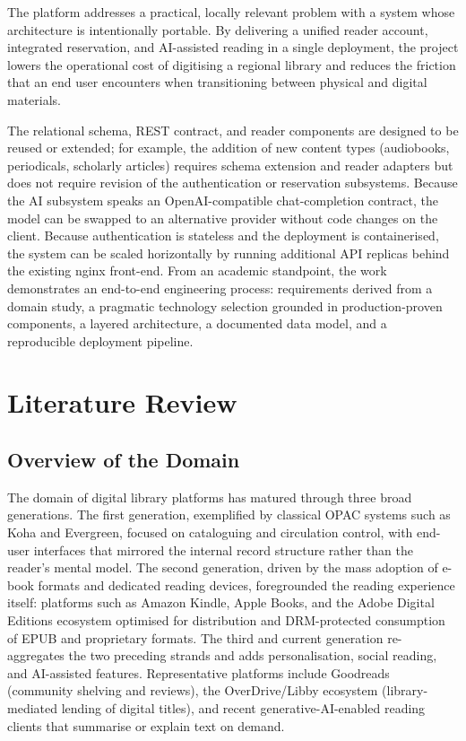 \documentclass[12pt,a4paper]{report}
\begin{document}
The platform addresses a practical, locally relevant problem with a system
whose architecture is intentionally portable. By delivering a unified
reader account, integrated reservation, and AI-assisted reading in a
single deployment, the project lowers the operational cost of digitising a
regional library and reduces the friction that an end user encounters when
transitioning between physical and digital materials.

The relational schema, REST contract, and reader components are designed to
be reused or extended; for example, the addition of new content types
(audiobooks, periodicals, scholarly articles) requires schema extension and
reader adapters but does not require revision of the authentication or
reservation subsystems. Because the AI subsystem speaks an OpenAI-compatible
chat-completion contract, the model can be swapped to an alternative
provider without code changes on the client. Because authentication is
stateless and the deployment is containerised, the system can be scaled
horizontally by running additional API replicas behind the existing nginx
front-end. From an academic standpoint, the work demonstrates an end-to-end
engineering process: requirements derived from a domain study, a pragmatic
technology selection grounded in production-proven components, a layered
architecture, a documented data model, and a reproducible deployment
pipeline.

\chapter{Literature Review}

\section{Overview of the Domain}

The domain of digital library platforms has matured through three broad
generations. The first generation, exemplified by classical OPAC systems
such as Koha and Evergreen, focused on cataloguing and circulation control,
with end-user interfaces that mirrored the internal record structure rather
than the reader's mental model. The second generation, driven by the mass
adoption of e-book formats and dedicated reading devices, foregrounded the
reading experience itself: platforms such as Amazon Kindle, Apple Books,
and the Adobe Digital Editions ecosystem optimised for distribution and
DRM-protected consumption of EPUB and proprietary formats. The third and
current generation re-aggregates the two preceding strands and adds
personalisation, social reading, and AI-assisted features. Representative
platforms include Goodreads (community shelving and reviews), the
OverDrive/Libby ecosystem (library-mediated lending of digital titles),
and recent generative-AI-enabled reading clients that summarise or explain
text on demand.
\end{document}
